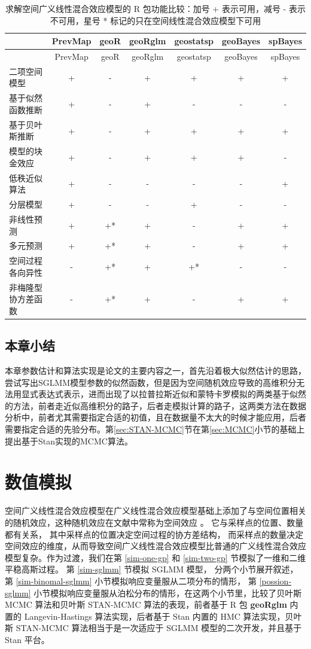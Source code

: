 \documentclass[12pt,a4paper,UTF8,twoside]{book}
\theoremstyle{definition}
\theoremstyle{definition}
\theoremstyle{definition}
\theoremstyle{remark}
\begin{document}
\begin{longtable}[]{@{}lcccccc@{}}
\caption{\label{tab:sglmm-packages} 求解空间广义线性混合效应模型的 R
包功能比较：加号 + 表示可用，减号 - 表示不可用，星号 *
标记的只在空间线性混合效应模型下可用}\tabularnewline
\toprule
& PrevMap & geoR & geoRglm & geostatsp & geoBayes &
spBayes\tabularnewline
\midrule
\endfirsthead
\toprule
& PrevMap & geoR & geoRglm & geostatsp & geoBayes &
spBayes\tabularnewline
\midrule
\endhead
二项空间模型 & + & - & + & + & + & +\tabularnewline
基于似然函数推断 & + & - & + & - & - & -\tabularnewline
基于贝叶斯推断 & + & - & + & + & + & +\tabularnewline
模型的块金效应 & + & - & + & + & + & -\tabularnewline
低秩近似算法 & + & - & - & - & - & +\tabularnewline
分层模型 & + & - & - & + & - & -\tabularnewline
非线性预测 & + & +* & + & - & + & +\tabularnewline
多元预测 & + & +* & + & - & + & +\tabularnewline
空间过程各向异性 & - & +* & + & +* & - & -\tabularnewline
非梅隆型协方差函数 & - & +* & + & - & + & +\tabularnewline
\bottomrule
\end{longtable}

\hypertarget{sec:estimations}{%
\section{本章小结}\label{sec:estimations}}

本章参数估计和算法实现是论文的主要内容之一，首先沿着极大似然估计的思路，尝试写出SGLMM模型参数的似然函数，但是因为空间随机效应导致的高维积分无法用显式表达式表示，进而出现了以拉普拉斯近似和蒙特卡罗模拟的两类基于似然的方法，前者走近似高维积分的路子，后者走模拟计算的路子，这两类方法在数据分析中，前者尤其需要指定合适的初值，且在数据量不太大的时候才能应用，后者需要指定合适的先验分布。第\ref{sec:STAN-MCMC}节在第\ref{sec:MCMC}小节的基础上提出基于Stan实现的MCMC算法。

\hypertarget{simulations}{%
\chapter{数值模拟}\label{simulations}}

空间广义线性混合效应模型在广义线性混合效应模型基础上添加了与空间位置相关的随机效应，这种随机效应在文献中常称为空间效应
\citep{Diggle1998}。 它与采样点的位置、数量都有关系，
其中采样点的位置决定空间过程的协方差结构，
而采样点的数量决定空间效应的维度，从而导致空间广义线性混合效应模型比普通的广义线性混合效应模型复杂。作为过渡，我们在第
\ref{sim-one-gp} 和 \ref{sim-two-gp} 节模拟了一维和二维平稳高斯过程。 第
\ref{sim-sglmm} 节模拟 SGLMM 模型， 分两个小节展开叙述，第
\ref{sim-binomal-sglmm} 小节模拟响应变量服从二项分布的情形， 第
\ref{possion-sglmm}
小节模拟响应变量服从泊松分布的情形，在这两个小节里，比较了贝叶斯 MCMC
算法和贝叶斯 STAN-MCMC 算法的表现，前者基于 R 包 \textbf{geoRglm} 内置的
Langevin-Hastings 算法实现，后者基于 Stan 内置的 HMC 算法实现，贝叶斯
STAN-MCMC 算法相当于是一次适应于 SGLMM 模型的二次开发，并且基于 Stan
平台。
\end{document}
